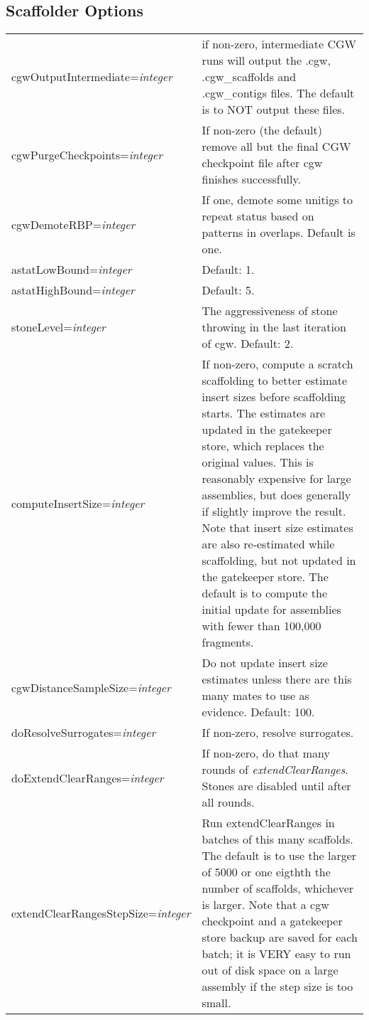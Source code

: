 \documentclass[twoside,11pt]{article}
\begin{document}
\subsection{Scaffolder Options}
\label{sec:scafopts}

\begin{longtable}{lp{3.0in}}

cgwOutputIntermediate={\it integer} &
if non-zero, intermediate CGW runs will output the .cgw,
.cgw\_scaffolds and .cgw\_contigs files.  The default is to NOT output
these files.
\\

cgwPurgeCheckpoints={\it integer} &
If non-zero (the default) remove all but the final CGW checkpoint file
after cgw finishes successfully.
\\

cgwDemoteRBP={\it integer} &
If one, demote some unitigs to repeat status based on patterns in
overlaps.  Default is one.
\\

astatLowBound={\it integer} &
Default: 1.
\\

astatHighBound={\it integer} &
Default: 5.
\\

stoneLevel={\it integer} &
The aggressiveness of stone throwing in the last iteration of cgw.  Default: 2.
\\

computeInsertSize={\it integer} &
If non-zero, compute a scratch scaffolding to better estimate insert
sizes before scaffolding starts.  The estimates are updated in the
gatekeeper store, which replaces the original values.  This is
reasonably expensive for large assemblies, but does generally if
slightly improve the result.  Note that insert size estimates are also
re-estimated while scaffolding, but not updated in the gatekeeper
store.  The default is to compute the initial update for assemblies
with fewer than 100,000 fragments.
\\

cgwDistanceSampleSize={\it integer} &
Do not update insert size estimates unless there are this many mates to use as evidence.
Default: 100.
\\

doResolveSurrogates={\it integer} &
If non-zero, resolve surrogates.
\\

doExtendClearRanges={\it integer} &
If non-zero, do that many rounds of {\it extendClearRanges}.  Stones are disabled
until after all rounds.
\\

extendClearRangesStepSize={\it integer} &
Run extendClearRanges in batches of this many scaffolds.  The default
is to use the larger of 5000 or one eigthth the number of scaffolds,
whichever is larger.  Note that a cgw checkpoint and a gatekeeper store
backup are saved for each batch; it is VERY easy to run out of disk space
on a large assembly if the step size is too small.
\\

\end{longtable}
\end{document}

